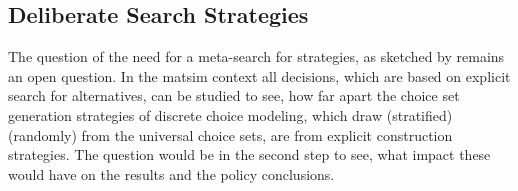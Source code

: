 
\subsection{Deliberate Search Strategies}
\label{sec:delib-search-strat}

The question of the need for a meta-search for strategies, as sketched by \citet[][]{ArthurBar} remains an open question. 
In the \gls{matsim} context all decisions, which are based on explicit search for alternatives, can be studied to see, how far apart the choice set generation strategies of discrete choice modeling, which draw (stratified) (randomly) from the universal choice sets, are from explicit construction strategies. 
The question would be in the second step to see, what impact these would have on the results and the policy conclusions. 

